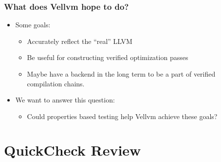 \documentclass{beamer}
\begin{document}
\begin{frame}
  \frametitle{What does Vellvm hope to do?}

  \begin{itemize}
  \item Some goals:
    \begin{itemize}
    \item Accurately reflect the ``real'' LLVM
    \item Be useful for constructing verified optimization passes
    \item Maybe have a backend in the long term to be a part of
      verified compilation chains.
    \end{itemize}

  \item We want to answer this question:
    
    \begin{itemize}
    \item Could properties based testing help Vellvm achieve these
      goals?
    \end{itemize}
  \end{itemize}
\end{frame}

\section{QuickCheck Review}
\end{document}
